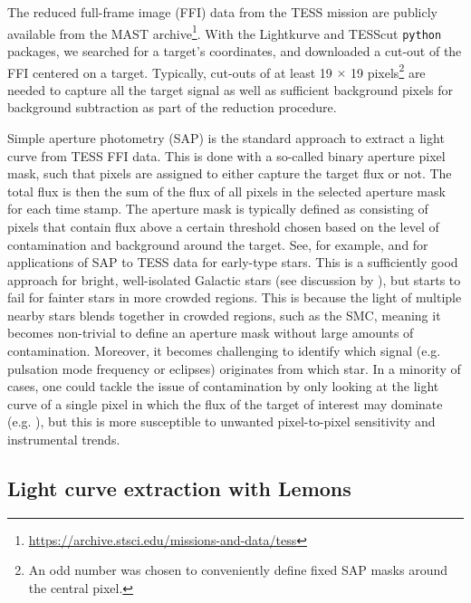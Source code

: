 \documentclass[fleqn,usenatbib]{mnras}
\begin{document}
The reduced full-frame image (FFI) data from the TESS mission are publicly available \citep{Jenkins+2016, TESS_2021} from the MAST archive\footnote{\url{https://archive.stsci.edu/missions-and-data/tess}}. With the {\sc Lightkurve} \citep{Lightkurve} and {\sc TESScut} \citep{TESScut_ref} \texttt{python} packages, we searched for a target's coordinates, and downloaded a cut-out of the FFI centered on a target. Typically, cut-outs of at least 19 $\times$ 19 pixels\footnote{An odd number was chosen to conveniently define fixed SAP masks around the central pixel.} are needed to capture all the target signal as well as sufficient background pixels for background subtraction as part of the reduction procedure.

Simple aperture photometry (SAP) is the standard approach to extract a light curve from TESS FFI data. This is done with a so-called binary aperture pixel mask, such that pixels are assigned to either capture the target flux or not. The total flux is then the sum of the flux of all pixels in the selected aperture mask for each time stamp. The aperture mask is typically defined as consisting of pixels that contain flux above a certain threshold chosen based on the level of contamination and background around the target. See, for example, \citet{Cubespec_Bowman2022} and \citet{Stefano_2022} for applications of SAP to TESS data for early-type stars. This is a sufficiently good approach for bright, well-isolated Galactic stars (see discussion by \citealt{Scott+2026}), but starts to fail for fainter stars in more crowded regions. This is because the light of multiple nearby stars blends together in crowded regions, such as the SMC, meaning it becomes non-trivial to define an aperture mask without large amounts of contamination. Moreover, it becomes challenging to identify which signal (e.g. pulsation mode frequency or eclipses) originates from which star. In a minority of cases, one could tackle the issue of contamination by only looking at the light curve of a single pixel in which the flux of the target of interest may dominate (e.g. \citealt{Higgins2023, Pauli2023a, Fritzewski+2025}), but this is more susceptible to unwanted pixel-to-pixel sensitivity and instrumental trends.

\subsection{Light curve extraction with {\sc Lemons}}\label{section: lemons}
\end{document}
